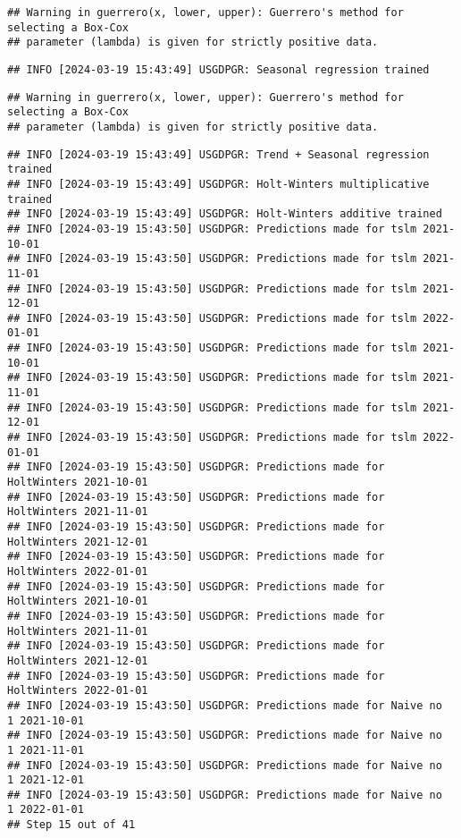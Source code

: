 \documentclass[
]{article}
\begin{document}
\begin{verbatim}
## Warning in guerrero(x, lower, upper): Guerrero's method for selecting a Box-Cox
## parameter (lambda) is given for strictly positive data.
\end{verbatim}

\begin{verbatim}
## INFO [2024-03-19 15:43:49] USGDPGR: Seasonal regression trained
\end{verbatim}

\begin{verbatim}
## Warning in guerrero(x, lower, upper): Guerrero's method for selecting a Box-Cox
## parameter (lambda) is given for strictly positive data.
\end{verbatim}

\begin{verbatim}
## INFO [2024-03-19 15:43:49] USGDPGR: Trend + Seasonal regression trained
## INFO [2024-03-19 15:43:49] USGDPGR: Holt-Winters multiplicative trained
## INFO [2024-03-19 15:43:49] USGDPGR: Holt-Winters additive trained
## INFO [2024-03-19 15:43:50] USGDPGR: Predictions made for tslm 2021-10-01
## INFO [2024-03-19 15:43:50] USGDPGR: Predictions made for tslm 2021-11-01
## INFO [2024-03-19 15:43:50] USGDPGR: Predictions made for tslm 2021-12-01
## INFO [2024-03-19 15:43:50] USGDPGR: Predictions made for tslm 2022-01-01
## INFO [2024-03-19 15:43:50] USGDPGR: Predictions made for tslm 2021-10-01
## INFO [2024-03-19 15:43:50] USGDPGR: Predictions made for tslm 2021-11-01
## INFO [2024-03-19 15:43:50] USGDPGR: Predictions made for tslm 2021-12-01
## INFO [2024-03-19 15:43:50] USGDPGR: Predictions made for tslm 2022-01-01
## INFO [2024-03-19 15:43:50] USGDPGR: Predictions made for HoltWinters 2021-10-01
## INFO [2024-03-19 15:43:50] USGDPGR: Predictions made for HoltWinters 2021-11-01
## INFO [2024-03-19 15:43:50] USGDPGR: Predictions made for HoltWinters 2021-12-01
## INFO [2024-03-19 15:43:50] USGDPGR: Predictions made for HoltWinters 2022-01-01
## INFO [2024-03-19 15:43:50] USGDPGR: Predictions made for HoltWinters 2021-10-01
## INFO [2024-03-19 15:43:50] USGDPGR: Predictions made for HoltWinters 2021-11-01
## INFO [2024-03-19 15:43:50] USGDPGR: Predictions made for HoltWinters 2021-12-01
## INFO [2024-03-19 15:43:50] USGDPGR: Predictions made for HoltWinters 2022-01-01
## INFO [2024-03-19 15:43:50] USGDPGR: Predictions made for Naive no  1 2021-10-01
## INFO [2024-03-19 15:43:50] USGDPGR: Predictions made for Naive no  1 2021-11-01
## INFO [2024-03-19 15:43:50] USGDPGR: Predictions made for Naive no  1 2021-12-01
## INFO [2024-03-19 15:43:50] USGDPGR: Predictions made for Naive no  1 2022-01-01
## Step 15 out of 41
\end{verbatim}
\end{document}
